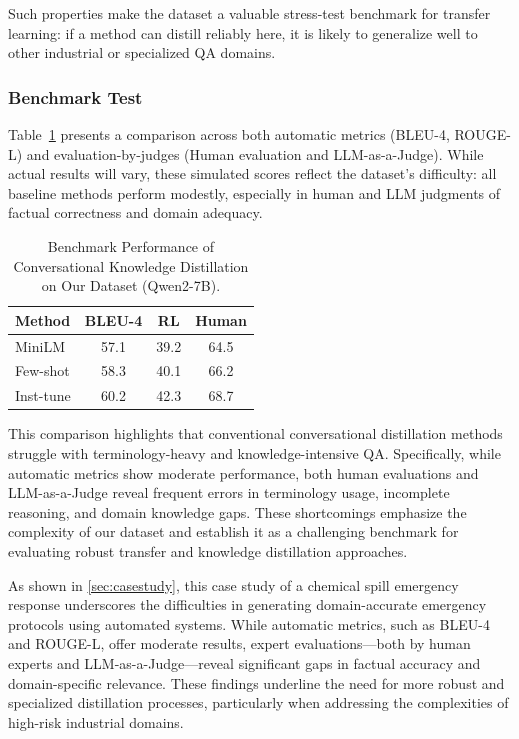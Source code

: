 \documentclass[preprint,12pt]{elsarticle}
\def\textbf#1{#1}%
\begin{document}
Such properties make the dataset a valuable \textbf{stress-test benchmark} for transfer learning: if a method can distill reliably here, it is likely to generalize well to other industrial or specialized QA domains.  

\subsubsection{Benchmark Test}  

Table~\ref{tab:challenge} presents a comparison across both automatic metrics (BLEU-4, ROUGE-L) and evaluation-by-judges (Human evaluation and LLM-as-a-Judge). While actual results will vary, these simulated scores reflect the dataset’s difficulty: all baseline methods perform modestly, especially in human and LLM judgments of factual correctness and domain adequacy.


\begin{table}[H]
\centering %
\begin{tabular}{lccc}
\toprule
Method & BLEU-4 & RL & Human \\
\midrule
MiniLM\cite{wang2020minilmdeepselfattentiondistillation} & 57.1 & 39.2 & 64.5 \\
Few-shot & 58.3 & 40.1 & 66.2 \\
Inst-tune & \textbf{60.2} & \textbf{42.3} & \textbf{68.7} \\
\bottomrule
\end{tabular}
\caption{Benchmark Performance of Conversational Knowledge Distillation on Our Dataset (Qwen2-7B).}
\label{tab:challenge}
\end{table}


This comparison highlights that conventional conversational distillation methods struggle with terminology-heavy and knowledge-intensive QA. Specifically, while automatic metrics show moderate performance, both human evaluations and LLM-as-a-Judge reveal frequent errors in terminology usage, incomplete reasoning, and domain knowledge gaps. These shortcomings emphasize the complexity of our dataset and establish it as a challenging benchmark for evaluating robust transfer and knowledge distillation approaches.




As shown in \ref{sec:casestudy}, this case study of a chemical spill emergency response underscores the difficulties in generating domain-accurate emergency protocols using automated systems. While automatic metrics, such as BLEU-4 and ROUGE-L, offer moderate results, expert evaluations—both by human experts and LLM-as-a-Judge—reveal significant gaps in factual accuracy and domain-specific relevance. These findings underline the need for more robust and specialized distillation processes, particularly when addressing the complexities of high-risk industrial domains.
\end{document}
